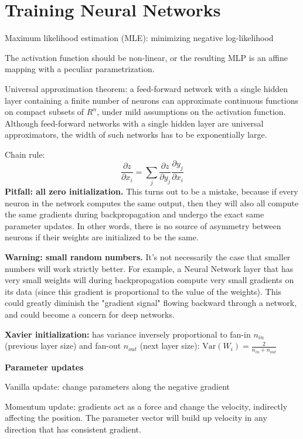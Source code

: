 \documentclass[12pt]{article}
\begin{document}
\section{Training Neural Networks}
\ulb
\item Maximum likelihood estimation (MLE): minimizing negative log-likelihood
\item The activation function should be non-linear, or the resulting MLP is an affine mapping with a peculiar parametrization.
\item Universal approximation theorem: a feed-forward network with a single hidden layer containing a finite number of neurons can approximate continuous functions on compact subsets of $R^n$, under mild assumptions on the activation function. Although feed-forward networks with a single hidden layer are universal approximators, the width of such networks has to be exponentially large. 
\item Chain rule: \[ \frac{\partial z}{\partial x_i} = \sum_j \frac{\partial z}{\partial y_j} \frac{\partial y_j}{\partial x_i} \]
\ule
\textbf{Pitfall: all zero initialization.} This turns out to be a mistake, because if every neuron in the network computes the same output, then they will also all compute the same gradients during backpropagation and undergo the exact same parameter updates. In other words, there is no source of asymmetry between neurons if their weights are initialized to be the same.
\par \textbf{Warning: small random numbers.} It's not necessarily the case that smaller numbers will work strictly better. For example, a Neural Network layer that has very small weights will during backpropagation compute very small gradients on its data (since this gradient is proportional to the value of the weights). This could greatly diminish the "gradient signal" flowing backward through a network, and could become a concern for deep networks.
\par \textbf{Xavier initialization: } has variance inversely proportional to fan-in $n_{in}$ (previous layer size) and fan-out $n_{out}$ (next layer size): $ \text{Var}(W_i) = \frac{2}{n_{in} + n_{out}} $ \\
\par \textbf{Parameter updates}
\ulb
\item Vanilla update: change parameters along the negative gradient
\item Momentum update: gradients act as a force and change the velocity, indirectly affecting the position. The parameter vector will build up velocity in any direction that has consistent gradient.
\end{document}
